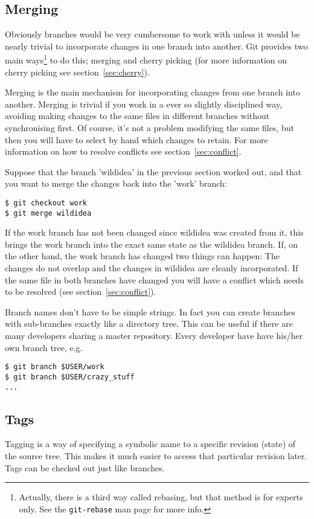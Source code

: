 \documentclass[a4paper,10pt]{article}
\begin{document}
\subsection{Merging}
Obviously branches would be very cumbersome to work with unless it would be
nearly trivial to incorporate changes in one branch into another. Git provides
two main ways\footnote{Actually, there is a third way called rebasing, but
that method is for experts only. See the \texttt{git-rebase} man page for more
info.} to do this; merging and cherry
picking (for more information on cherry picking see
section~\ref{sec:cherry}).

Merging is the main mechanism for incorporating changes from one branch 
into another. Merging is trivial if you work in a ever so slightly disciplined
way, avoiding making changes to the same files in different branches without
synchronising first. Of course, it's not a problem modifying the same files,
but then you will have to select by hand which changes to retain. For more
information on how to resolve conflicts see section~\ref{sec:conflict}.

Suppose that the branch 'wildidea' in the previous section worked out, and
that you want to merge the changes back into the 'work' branch:
\begin{verbatim}
$ git checkout work
$ git merge wildidea
\end{verbatim}
If the work branch has not been changed since wildidea was created from it, 
this brings the work branch into 
the exact same state as the  wildidea branch. If, on the other hand, the work
branch has changed two things can happen: The changes do not overlap and the
changes in wildidea are cleanly incorporated. If the same file in both
branches have changed you will have a conflict which needs to be resolved
(see section~\ref{sec:conflict}).

Branch names don't have to be simple strings. In fact you can create branches
with sub-branches exactly like a directory tree. This can be useful if there
are many developers sharing a master repository. Every developer have have
his/her own branch tree, e.g.
\begin{verbatim}
$ git branch $USER/work
$ git branch $USER/crazy_stuff
...
\end{verbatim}

\subsection{Tags}
Tagging is a way of specifying a symbolic name to a specific revision (state) 
of the source tree. This makes it much easier to access that particular
revision later. Tags can be checked out just like branches.
\end{document}
